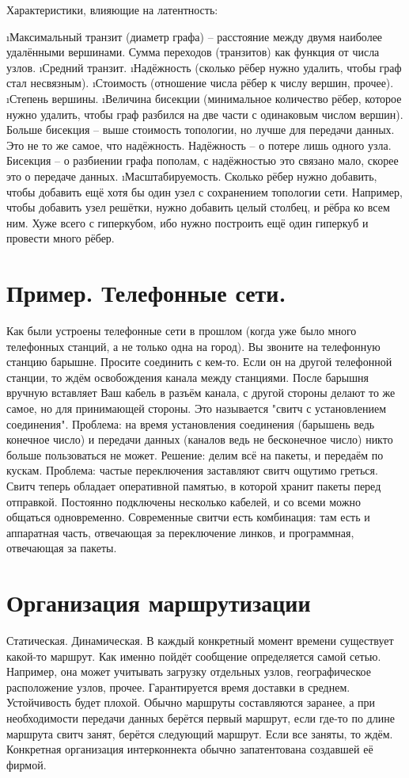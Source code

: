  Характеристики, влияющие на латентность:
 \begin{enumerate}
 	\i Максимальный транзит (диаметр графа) -- расстояние между двумя наиболее удалёнными вершинами. 
 	Сумма переходов (транзитов) как функция от числа узлов.
 	\i Средний транзит.
 	\i Надёжность (сколько рёбер нужно удалить, чтобы граф стал несвязным).
 	\i Стоимость (отношение числа рёбер к числу вершин, прочее).
 	\i Степень вершины.
 	\i Величина бисекции (минимальное количество рёбер, которое нужно удалить, чтобы граф разбился на две части с одинаковым числом вершин). Больше бисекция -- выше стоимость топологии, но лучше для передачи данных.
 	Это не то же самое, что надёжность. Надёжность -- о потере лишь одного узла. Бисекция -- о разбиении графа пополам, с надёжностью это связано мало, скорее это о передаче данных.
 	\i Масштабируемость. Сколько рёбер нужно добавить, чтобы добавить ещё хотя бы один узел с сохранением топологии сети. Например, чтобы добавить узел решётки, нужно добавить целый столбец, и рёбра ко всем ним. Хуже всего с гиперкубом, ибо нужно построить ещё один гиперкуб и провести много рёбер. 
 \end{enumerate} 

 \section{Пример. Телефонные сети.}
  Как были устроены телефонные сети в прошлом (когда уже было много телефонных станций, а не только одна на город).
  Вы звоните на телефонную станцию барышне. Просите соединить с кем-то. Если он на другой телефонной станции, то ждём освобождения канала между станциями. После барышня вручную вставляет Ваш кабель в разъём канала, с другой стороны делают то же самое, но для принимающей стороны. Это называется "свитч с установлением соединения". Проблема: на время установления соединения (барышень ведь конечное число) и передачи данных (каналов ведь не бесконечное число) никто больше пользоваться не может. Решение: делим всё на пакеты, и передаём по кускам. Проблема: частые переключения заставляют свитч ощутимо греться.
  Свитч теперь обладает оперативной памятью, в которой хранит пакеты перед отправкой. Постоянно подключены несколько кабелей, и со всеми можно общаться одновременно.
  Современные свитчи есть комбинация: там есть и аппаратная часть, отвечающая за переключение линков, и программная, отвечающая за пакеты.
  
  \section{Организация маршрутизации}
  Статическая.
  Динамическая. В каждый конкретный момент времени существует какой-то маршрут. Как именно пойдёт сообщение определяется самой сетью. Например, она может учитывать загрузку отдельных узлов, географическое расположение узлов, прочее. Гарантируется время доставки в среднем. Устойчивость будет плохой.
  Обычно маршруты составляются заранее, а при необходимости передачи данных берётся первый маршрут, если где-то по длине маршрута свитч занят, берётся следующий маршрут. Если все заняты, то ждём. Конкретная организация интерконнекта обычно запатентована создавшей её фирмой.
  
